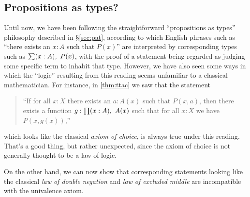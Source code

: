 \subsection{Propositions as types?}
\label{subsec:pat?}

Until now, we have been following the straightforward ``propositions as types'' philosophy described in \S\ref{sec:pat}, according to which English phrases such as ``there exists an $x:A$ such that $P(x)$'' are interpreted by corresponding types such as $\sm{x:A} P(x)$, with the proof of a statement being regarded as judging some specific term to inhabit that type.
However, we have also seen some ways in which the ``logic'' resulting from this reading seems unfamiliar to a classical mathematician.
For instance, in \autoref{thm:ttac} we saw that the statement
\begin{quote}
  ``If for all $x:X$ there exists an $a:A(x)$ such that $P(x,a)$, then there exists a function $g:\prd{x:A} A(x)$ such that for all $x:X$ we have $P(x,g(x))$,''
\end{quote}
which looks like the classical \emph{axiom of choice}, is always true under this reading.  That's a good thing, but rather unexpected, since the axiom of choice is not generally thought to be a law of logic.

On the other hand, we can now show that corresponding statements looking like the classical \emph{law of double negation} and \emph{law of excluded middle} are incompatible with the univalence axiom.

